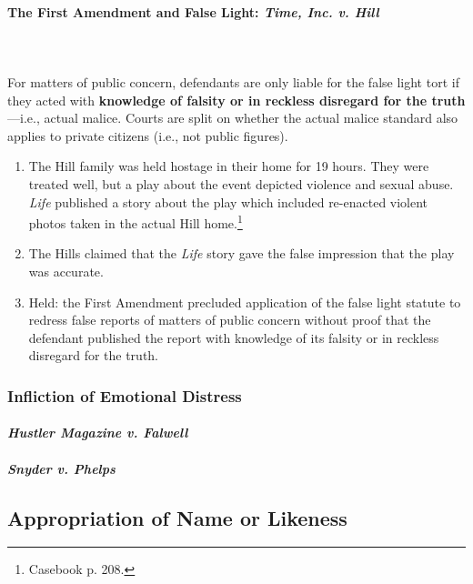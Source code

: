 \paragraph{The First Amendment and False Light: \emph{Time, Inc. v. Hill}}
~\\\\
For matters of public concern, defendants are only liable for the false light 
tort if they acted with \textbf{knowledge of falsity or in reckless disregard 
for the truth}---i.e., actual malice. Courts are split on whether the actual 
malice standard also applies to private citizens (i.e., not public figures).

\begin{enumerate}
    \item The Hill family was held hostage in their home for 19 hours. They were 
    treated well, but a play about the event depicted violence and sexual abuse. 
    \emph{Life} published a story about the play which included re-enacted 
    violent photos taken in the actual Hill home.\footnote{Casebook p. 208.}
    \item The Hills claimed that the \emph{Life} story gave the false impression 
    that the play was accurate.
    \item Held: the First Amendment precluded application of the false light 
    statute to redress false reports of matters of public concern without proof 
    that the defendant published the report with knowledge of its falsity or in
    reckless disregard for the truth.
\end{enumerate}

\subsubsection{Infliction of Emotional Distress}

\paragraph{\emph{Hustler Magazine v. Falwell}}


\paragraph{\emph{Snyder v. Phelps}}


\subsection{Appropriation of Name or Likeness}

